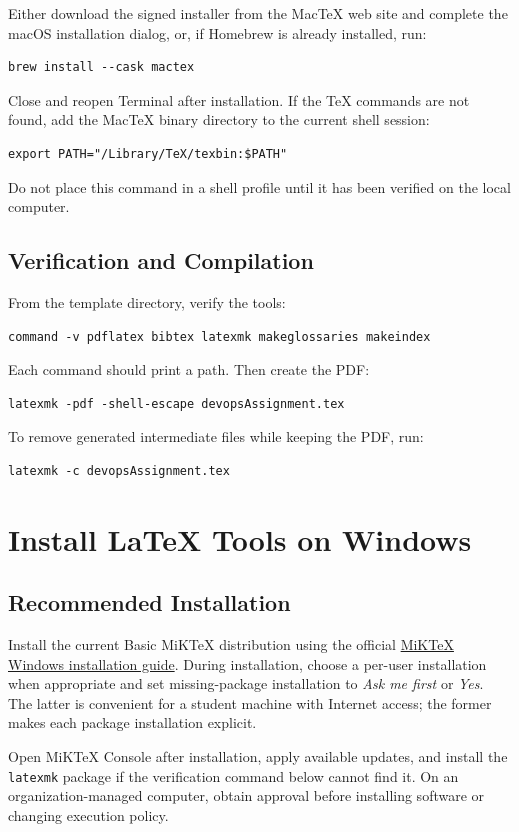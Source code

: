 Either download the signed installer from the MacTeX web site and complete the
macOS installation dialog, or, if Homebrew is already installed, run:
\begin{verbatim}
brew install --cask mactex
\end{verbatim}
Close and reopen Terminal after installation. If the TeX commands are not
found, add the MacTeX binary directory to the current shell session:
\begin{verbatim}
export PATH="/Library/TeX/texbin:$PATH"
\end{verbatim}
Do not place this command in a shell profile until it has been verified on the
local computer.

\subsection{Verification and Compilation}
From the template directory, verify the tools:
\begin{verbatim}
command -v pdflatex bibtex latexmk makeglossaries makeindex
\end{verbatim}
Each command should print a path. Then create the PDF:
\begin{verbatim}
latexmk -pdf -shell-escape devopsAssignment.tex
\end{verbatim}
To remove generated intermediate files while keeping the PDF, run:
\begin{verbatim}
latexmk -c devopsAssignment.tex
\end{verbatim}

\section{Install LaTeX Tools on Windows}
\subsection{Recommended Installation}
Install the current Basic MiKTeX distribution using the official
\href{https://miktex.org/howto/install-miktex}{MiKTeX Windows installation
guide}. During installation, choose a per-user installation when appropriate
and set missing-package installation to \emph{Ask me first} or \emph{Yes}.
The latter is convenient for a student machine with Internet access; the former
makes each package installation explicit.

Open MiKTeX Console after installation, apply available updates, and install
the \texttt{latexmk} package if the verification command below cannot find it.
On an organization-managed computer, obtain approval before installing software
or changing execution policy.

